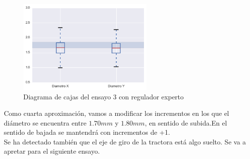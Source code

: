 \begin{figure}[H]
    \centering
    \includegraphics[width=0.6\textwidth]{images/producciones/12082015/output_10_e2.png}
    \caption{Diagrama de cajas del ensayo 3 con regulador experto}
    \label{fig:reg_cajas3}
\end{figure}

Como cuarta  aproximación, vamos a  modificar los incrementos en los que el diámetro se encuentra entre $1.70 mm$ y $1.80 mm$, en sentido de subida.En el sentido de bajada se mantendrá con incrementos de +1.\\

Se ha detectado también que el eje de giro de la tractora está algo suelto. Se va a apretar para el siguiente ensayo.\\
